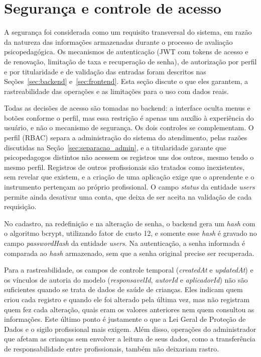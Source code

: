 \section{Segurança e controle de acesso}\label{sec:seguranca}

A segurança foi considerada como um requisito transversal do sistema, em razão da natureza das informações armazenadas durante o processo de avaliação psicopedagógica. Os mecanismos de autenticação (JWT com tokens de acesso e de renovação, limitação de taxa e recuperação de senha), de autorização por perfil e por titularidade e de validação das entradas foram descritos nas Seções~\ref{sec:backend} e~\ref{sec:frontend}. Esta seção discute o que eles garantem, a rastreabilidade das operações e as limitações para o uso com dados reais.

Todas as decisões de acesso são tomadas no backend: a interface oculta menus e botões conforme o perfil, mas essa restrição é apenas um auxílio à experiência do usuário, e não o mecanismo de segurança. Os dois controles se complementam. O perfil (RBAC) separa a administração do sistema do atendimento, pelas razões discutidas na Seção~\ref{sec:separacao_admin}, e a titularidade garante que psicopedagogos distintos não acessem os registros uns dos outros, mesmo tendo o mesmo perfil. Registros de outros profissionais são tratados como inexistentes, sem revelar que existem, e a criação de uma aplicação exige que o aprendente e o instrumento pertençam ao próprio profissional. O campo \textit{status} da entidade \textit{users} permite ainda desativar uma conta, que deixa de ser aceita na validação de cada requisição.

No cadastro, na redefinição e na alteração de senha, o backend gera um \textit{hash} com o algoritmo bcrypt, utilizando fator de custo 12, e somente esse \textit{hash} é gravado no campo \textit{passwordHash} da entidade \textit{users}. Na autenticação, a senha informada é comparada ao \textit{hash} armazenado, sem que a senha original precise ser recuperada.

Para a rastreabilidade, os campos de controle temporal (\textit{createdAt} e \textit{updatedAt}) e os vínculos de autoria do modelo (\textit{responsavelId}, \textit{autorId} e \textit{aplicadorId}) não são suficientes quando se trata de dados de saúde de crianças. Eles indicam quem criou cada registro e quando ele foi alterado pela última vez, mas não registram quem fez cada alteração, quais eram os valores anteriores nem quem consultou as informações. Este último ponto é justamente o que a Lei Geral de Proteção de Dados e o sigilo profissional mais exigem. Além disso, operações do administrador que afetam as crianças sem envolver a leitura de seus dados, como a transferência de responsabilidade entre profissionais, também não deixariam rastro.

